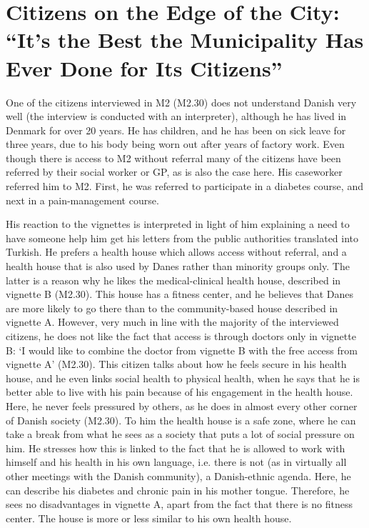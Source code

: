 \section{Citizens on the Edge of the City: “It's the Best the Municipality Has Ever Done for Its Citizens”}
One of the citizens interviewed in M2 (M2.30) does not understand Danish very well (the interview is conducted with an interpreter), although he has lived in Denmark for over 20 years. He has children, and he has been on sick leave for three years, due to his body being worn out after years of factory work. Even though there is access to M2 without referral many of the citizens have been referred by their social worker or GP, as is also the case here. His caseworker referred him to M2. First, he was referred to participate in a diabetes course, and next in a pain-management course. 
\par
His reaction to the vignettes is interpreted in light of him explaining a need to have someone help him get his letters from the public authorities translated into Turkish. He prefers a health house which allows access without referral, and a health house that is also used by Danes rather than minority groups only. The latter is a reason why he likes the medical-clinical health house, described in vignette B (M2.30). This house has a fitness center, and he believes that Danes are more likely to go there than to the community-based house described in vignette A. However, very much in line with the majority of the interviewed citizens, he does not like the fact that access is through doctors only in vignette B: ‘I would like to combine the doctor from vignette B with the free access from vignette A’ (M2.30). This citizen talks about how he feels secure in his health house, and he even links social health to physical health, when he says that he is better able to live with his pain because of his engagement in the health house. Here, he never feels pressured by others, as he does in almost every other corner of Danish society (M2.30). To him the health house is a safe zone, where he can take a break from what he sees as a society that puts a lot of social pressure on him. He stresses how this is linked to the fact that he is allowed to work with himself and his health in his own language, i.e. there is not (as in virtually all other meetings with the Danish community), a Danish-ethnic agenda. Here, he can describe his diabetes and chronic pain in his mother tongue. Therefore, he sees no disadvantages in vignette A, apart from the fact that there is no fitness center. The house is more or less similar to his own health house.
